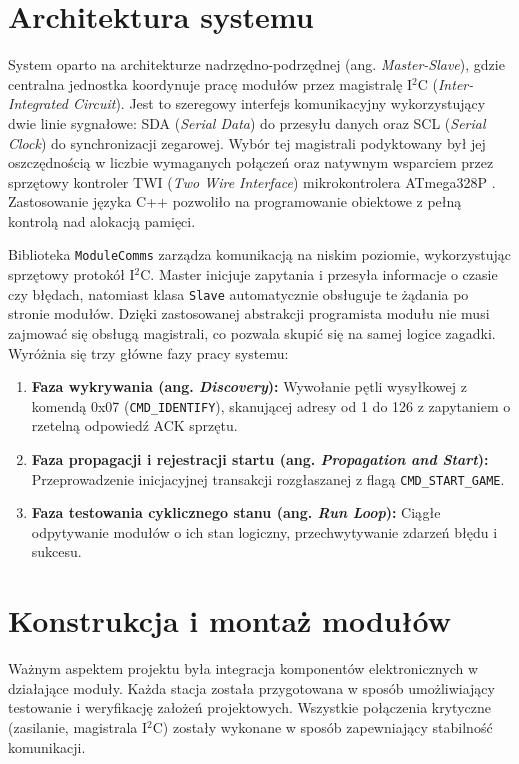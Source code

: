 \documentclass{SGGW-thesis}
\begin{document}
\section{Architektura systemu}
System oparto na architekturze nadrzędno-podrzędnej (ang. \textit{Master-Slave}), gdzie centralna jednostka koordynuje pracę modułów przez magistralę I$^2$C (\textit{Inter-Integrated Circuit}). Jest to szeregowy interfejs komunikacyjny wykorzystujący dwie linie sygnałowe: SDA (\textit{Serial Data}) do przesyłu danych oraz SCL (\textit{Serial Clock}) do synchronizacji zegarowej. Wybór tej magistrali podyktowany był jej oszczędnością w liczbie wymaganych połączeń oraz natywnym wsparciem przez sprzętowy kontroler TWI (\textit{Two Wire Interface}) mikrokontrolera ATmega328P \cite{atmega328p_datasheet}. Zastosowanie języka C++ pozwoliło na programowanie obiektowe z pełną kontrolą nad alokacją pamięci.

Biblioteka \texttt{ModuleComms} zarządza komunikacją na niskim poziomie, wykorzystując sprzętowy protokół I$^2$C. Master inicjuje zapytania i przesyła informacje o czasie czy błędach, natomiast klasa \texttt{Slave} automatycznie obsługuje te żądania po stronie modułów. Dzięki zastosowanej abstrakcji programista modułu nie musi zajmować się obsługą magistrali, co pozwala skupić się na samej logice zagadki. Wyróżnia się trzy główne fazy pracy systemu:
\begin{enumerate}
  \item \textbf{Faza wykrywania (ang. \textit{Discovery}):} Wywołanie pętli wysyłkowej z komendą 0x07 (\texttt{CMD\_IDENTIFY}), skanującej adresy od 1 do 126 z zapytaniem o rzetelną odpowiedź ACK sprzętu.
  \item \textbf{Faza propagacji i rejestracji startu (ang. \textit{Propagation and Start}):} Przeprowadzenie inicjacyjnej transakcji rozgłaszanej z flagą \texttt{CMD\_START\_GAME}.
  \item \textbf{Faza testowania cyklicznego stanu (ang. \textit{Run Loop}):} Ciągłe odpytywanie modułów o ich stan logiczny, przechwytywanie zdarzeń błędu i sukcesu.
\end{enumerate}

\section{Konstrukcja i montaż modułów}
Ważnym aspektem projektu była integracja komponentów elektronicznych w działające moduły. Każda stacja została przygotowana w sposób umożliwiający testowanie i weryfikację założeń projektowych. Wszystkie połączenia krytyczne (zasilanie, magistrala I$^2$C) zostały wykonane w sposób zapewniający stabilność komunikacji.
\end{document}
